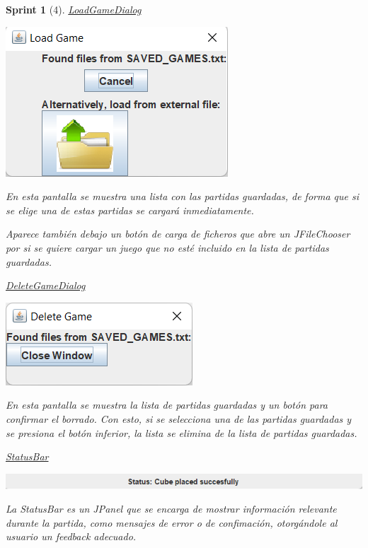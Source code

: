 \documentclass[12pt,a4paper,openright]{book}
\theoremstyle{break}
\newtheorem*{sprint}{Sprint}
\begin{document}
\begin{sprint}[4]
\underline{LoadGameDialog}
\begin{center}
\includegraphics[scale=0.8]{load-dialog-sprint3.png}
\end{center}

En esta pantalla se muestra una lista con las partidas guardadas, de forma que si se elige una de estas partidas se cargará inmediatamente.

Aparece también debajo un botón de carga de ficheros que abre un  \textit{JFileChooser} por si se quiere cargar un juego que no esté incluido en la lista de partidas guardadas.

\underline{DeleteGameDialog}
\begin{center}
\includegraphics[scale=0.8]{delete-dialog-sprint3.png}
\end{center}

En esta pantalla se muestra la lista de partidas guardadas y un botón para confirmar el borrado. Con esto, si se selecciona una de las partidas guardadas y se presiona el botón inferior, la lista se elimina de la lista de partidas guardadas.

\underline{StatusBar}
\begin{center}
\includegraphics[scale=0.8]{status-bar-sprint3.png}
\end{center}

La \textit{StatusBar} es un \textit{JPanel} que se encarga de mostrar información relevante durante la partida, como mensajes de error o de confimación, otorgándole al usuario un feedback adecuado.


\end{sprint}
\end{document}
